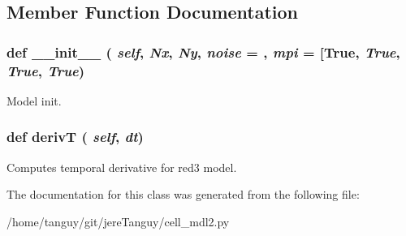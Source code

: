 \subsection{Member Function Documentation}
\hypertarget{classcell__mdl2_1_1_red3_ac775ee34451fdfa742b318538164070e}{
\subsubsection[{\_\-\_\-init\_\-\_\-}]{\setlength{\rightskip}{0pt plus 5cm}def \_\-\_\-init\_\-\_\- ( {\em self}, \/   {\em Nx}, \/   {\em Ny}, \/   {\em noise} = {}, \/   {\em mpi} = {\ttfamily \mbox{[}True}, \/   {\em True}, \/   {\em True}, \/   {\em True})}}
\label{classcell__mdl2_1_1_red3_ac775ee34451fdfa742b318538164070e}
\begin{DoxyVerb}Model init.\end{DoxyVerb}
 \hypertarget{classcell__mdl2_1_1_red3_ad67701a6bb599a16a9eb386aa1cd4328}{
\subsubsection[{derivT}]{\setlength{\rightskip}{0pt plus 5cm}def derivT ( {\em self}, \/   {\em dt})}}
\label{classcell__mdl2_1_1_red3_ad67701a6bb599a16a9eb386aa1cd4328}
\begin{DoxyVerb}Computes temporal derivative for red3 model.\end{DoxyVerb}
 

The documentation for this class was generated from the following file:\begin{DoxyCompactItemize}
\item 
/home/tanguy/git/jereTanguy/cell\_\-mdl2.py\end{DoxyCompactItemize}
